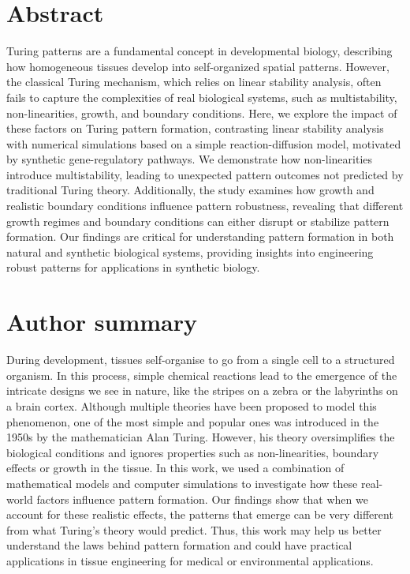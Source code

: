\documentclass[10pt,letterpaper]{article}
\begin{document}
\section*{Abstract}
Turing patterns are a fundamental concept in developmental biology, describing how homogeneous tissues develop into self-organized spatial patterns. However, the classical Turing mechanism, which relies on linear stability analysis, often fails to capture the complexities of real biological systems, such as multistability, non-linearities, growth, and boundary conditions. Here, we explore the impact of these factors on Turing pattern formation, contrasting linear stability analysis with numerical simulations based on a simple reaction-diffusion model, motivated by synthetic gene-regulatory pathways. We demonstrate how non-linearities introduce multistability, leading to unexpected pattern outcomes not predicted by traditional Turing theory. Additionally, the study examines how growth and realistic boundary conditions influence pattern robustness, revealing that different growth regimes and boundary conditions can either disrupt or stabilize pattern formation. Our findings are critical for understanding pattern formation in both natural and synthetic biological systems, providing insights into engineering robust patterns for applications in synthetic biology.


\section*{Author summary}
During development, tissues self-organise to go from a single cell to a structured organism. In this process, simple chemical reactions lead to the emergence of the intricate designs we see in nature, like the stripes on a zebra or the labyrinths on a brain cortex. Although multiple theories have been proposed to model this phenomenon, one of the most simple and popular ones was introduced in the 1950s by the mathematician Alan Turing. However, his theory oversimplifies the biological conditions and ignores properties such as non-linearities, boundary effects or growth in the tissue. In this work, we used a combination of mathematical models and computer simulations to investigate how these real-world factors influence pattern formation. Our findings show that when we account for these realistic effects, the patterns that emerge can be very different from what Turing's theory would predict. Thus, this work may help us better understand the laws behind pattern formation and could have practical applications in tissue engineering for medical or environmental applications. 
\end{document}
